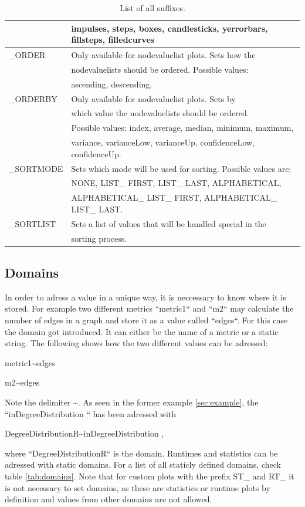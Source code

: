 \begin{table}[hp]
\begin{tabular}[h]{|l|l|}
	&	impulses, steps, boxes, candlesticks, yerrorbars, fillsteps, filledcurves\\
	\hline
	{\_}ORDER & Only available for nodevaluelist plots. Sets how the\\
	&	nodevaluelists should be ordered. Possible values:\\
	&	ascending, descending.\\
	\hline
	{\_}ORDERBY & Only available for nodevaluelist plots. Sets by\\
	&	which value the nodevaluelists should be ordered. \\
	&	Possible values: index, average, median, minimum, maximum,\\
	&	variance, varianceLow, varianceUp, confidenceLow, confidenceUp.\\
	\hline
	{\_}SORTMODE & Sets which mode will be used for sorting. Possible values are:\\
	& NONE, LIST\_ FIRST, LIST\_ LAST, ALPHABETICAL,\\
	& ALPHABETICAL\_ LIST\_ FIRST, ALPHABETICAL\_ LIST\_ LAST.\\
	\hline
	{\_}SORTLIST & Sets a list of values that will be handled special in the\\ 
	& sorting process.\\
	\hline
\end{tabular}
\caption{List of all suffixes.}
\label{tab:suffixes}
\end{table}

\subsection{Domains}
In order to adress a value in a unique way, it is neccessary to know where it is stored. For example two different metrics “metric1“ and “m2“ may calculate the number of edges in a graph and store it as a value called “edges“. For this case the domain got introduced. It can either be the name of a metric or a static string. The following shows how the two different values can be adressed:

\centerline{metric1\textasciitilde edges}
\centerline{m2\textasciitilde edges}

Note the delimiter \textasciitilde .
As seen in the former example \ref{sec:example}, the “inDegreeDistribution “ has been adressed with

\centerline{DegreeDistributionR\textasciitilde inDegreeDistribution	,}

where “DegreeDistributionR“ is the domain. Runtimes and statistics can be adressed with static domains. For a list of all staticly defined domains, check table \ref{tab:domains}. Note that for custom plots with the prefix ST{\_} and RT{\_} it is not necessary to set domains, as these are statistics or runtime plots by definition and values from other domains are not allowed.

